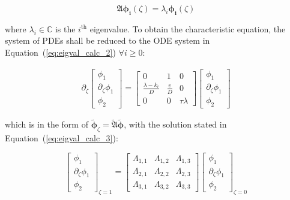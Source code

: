 \begin{equation} \label{eq:eig_prob}
        \mathfrak{A} \bm{\phi_i}(\zeta) = \lambda_i \bm{\phi_i}(\zeta)
\end{equation}


where $\lambda_i \in \mathbb{C}$ is the $i^{\text{th}}$ eigenvalue. To obtain the characteristic equation, the system of PDEs shall be reduced to the ODE system in Equation~(\ref{eq:eigval_calc_2}) $\forall i \geq 0$:

\begin{equation} \label{eq:eigval_calc_2}
    \begin{aligned}
        \partial_\zeta \begin{bmatrix}
            \phi_1 \\ \partial_\zeta \phi_1 \\ \phi_2
        \end{bmatrix} = \begin{bmatrix}
            0 & 1 & 0 \\
            \frac{\lambda-k_r}{D} & \frac{v}{D} & 0 \\
            0 & 0 & \tau \lambda 
        \end{bmatrix} \begin{bmatrix}
            \phi_1 \\ \partial_\zeta \phi_1 \\ \phi_2
        \end{bmatrix}
    \end{aligned}
\end{equation}

which is in the form of $ \tilde{\bm{\phi}}_\zeta  = \tilde{\mathfrak{A}} \tilde{\bm{\phi}}$, with the solution stated in Equation~(\ref{eq:eigval_calc_3}):

\begin{equation} \label{eq:eigval_calc_3}
    \begin{bmatrix}
        \phi_1 \\ \partial_\zeta \phi_1 \\ \phi_2
    \end{bmatrix}_{\zeta=1} = \begin{bmatrix}
        \Lambda_{1,1} & \Lambda_{1,2} & \Lambda_{1,3} \\
        \Lambda_{2,1} & \Lambda_{2,2} & \Lambda_{2,3} \\
        \Lambda_{3,1} & \Lambda_{3,2} & \Lambda_{3,3}
    \end{bmatrix} \begin{bmatrix}
        \phi_1 \\ \partial_\zeta \phi_1 \\ \phi_2
    \end{bmatrix}_{\zeta=0}
\end{equation}

